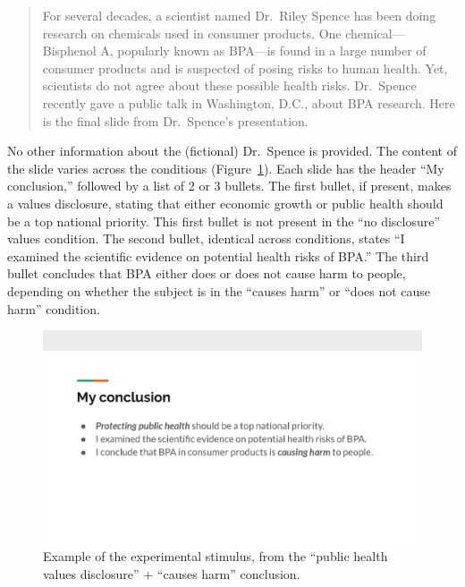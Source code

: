 \documentclass[
  letterpaper,
  DIV=11,
  numbers=noendperiod]{scrartcl}
\begin{document}
\begin{quote}
For several decades, a scientist named Dr.~Riley Spence has been doing
research on chemicals used in consumer products. One
chemical---Bisphenol A, popularly known as BPA---is found in a large
number of consumer products and is suspected of posing risks to human
health. Yet, scientists do not agree about these possible health risks.
Dr.~Spence recently gave a public talk in Washington, D.C., about BPA
research. Here is the final slide from Dr.~Spence's presentation.
\end{quote}

No other information about the (fictional) Dr.~Spence is provided. The
content of the slide varies across the conditions
(Figure~\ref{fig-stimulus}). Each slide has the header ``My
conclusion,'' followed by a list of 2 or 3 bullets. The first bullet, if
present, makes a values disclosure, stating that either economic growth
or public health should be a top national priority. This first bullet is
not present in the ``no disclosure'' values condition. The second
bullet, identical across conditions, states ``I examined the scientific
evidence on potential health risks of BPA.'' The third bullet concludes
that BPA either does or does not cause harm to people, depending on
whether the subject is in the ``causes harm'' or ``does not cause harm''
condition.

\begin{figure}

{\centering \includegraphics{fig1_stimulus.png}

}

\caption{\label{fig-stimulus}Example of the experimental stimulus, from
the ``public health values disclosure'' + ``causes harm'' conclusion.}

\end{figure}
\end{document}
